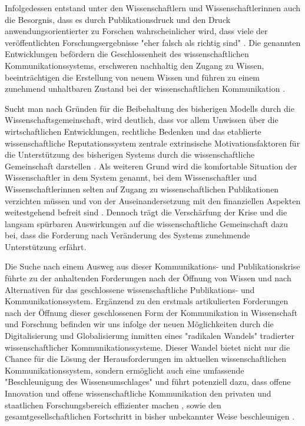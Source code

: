Infolgedessen entstand unter den Wissenschaftlern und Wissenschaftlerinnen auch die Besorgnis, dass es durch Publikationsdruck und den Druck anwendungsorientierter zu Forschen wahrscheinlicher wird, dass viele der veröffentlichten Forschungsergebnisse "eher falsch als richtig sind" \cite{Ioannidis_2005}. Die genannten Entwicklungen befördern die Geschlossenheit des wissenschaftlichen Kommunikationssystems, erschweren nachhaltig den Zugang zu Wissen, beeinträchtigen die Erstellung von neuem Wissen \cite{cite:5} \cite{cite:8} \cite{Luhmann1998} und führen zu einem zunehmend unhaltbaren Zustand bei der wissenschaftlichen Kommunikation \cite{Schekman_2013}.

Sucht man nach Gründen für die Beibehaltung des bisherigen Modells durch die Wissenschaftsgemeinschaft, wird deutlich, dass vor allem Unwissen über die wirtschaftlichen Entwicklungen, rechtliche Bedenken und das etablierte wissenschaftliche Reputationssystem zentrale extrinsische Motivationsfaktoren für die Unterstützung des bisherigen Systems durch die wissenschaftliche Gemeinschaft darstellen \cite{minssen_2012_arbeit}. Als weiteren Grund wird die komfortable Situation der Wissenschaftler in dem System genannt, bei dem Wissenschaftler und Wissenschaftlerinnen selten auf Zugang zu wissenschaftlichen Publikationen verzichten müssen und von der Auseinandersetzung mit den finanziellen Aspekten weitestgehend befreit sind \cite{herb_2010} \cite{Sietmann_oa_2007} \cite{hanekop_2006}. Dennoch trägt die Verschärfung der Krise und die langsam spürbaren Auswirkungen auf die wissenschaftliche Gemeinschaft dazu bei, dass die Forderung nach Veränderung des Systems zunehmende Unterstützung erfährt.

Die Suche nach einem Ausweg aus dieser Kommunikations- und Publikationskrise führte zu der anhaltenden Forderungen nach der Öffnung von Wissen und nach Alternativen für das geschlossene wissenschaftliche Publikations- und Kommunikationssystem. Ergänzend zu den erstmals artikulierten Forderungen nach der Öffnung dieser geschlossenen Form der Kommunikation in Wissenschaft und Forschung befinden wir uns infolge der neuen Möglichkeiten durch die Digitalisierung und Globalisierung \cite{mcluhan_1962_gutenberg} inmitten eines "radikalen Wandels" \cite{poynder_2011_suber} tradierter wissenschaftlicher Kommunikationssysteme. Dieser Wandel bietet nicht nur die Chance für die Lösung der Herausforderungen im aktuellen wissenschaftlichen Kommunikationssystem, sondern ermöglicht auch eine umfassende "Beschleunigung des Wissensumschlages" \cite{Wenzel_2003} und führt potenziell dazu, dass offene Innovation und offene wissenschaftliche Kommunikation den privaten und staatlichen Forschungsbereich effizienter machen \cite{chesbrough_2006_open}, sowie den gesamtgesellschaftlichen Fortschritt in bisher unbekannter Weise beschleunigen \cite{cite:7}.


